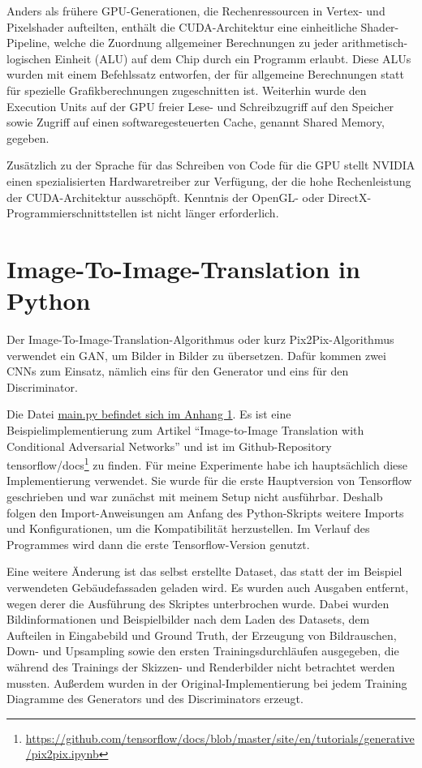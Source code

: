 Anders als frühere GPU-Generationen, die Rechenressourcen in Vertex- und Pixelshader aufteilten, enthält die CUDA-Architektur eine einheitliche Shader-Pipeline, welche die Zuordnung allgemeiner Berechnungen zu jeder arithmetisch-logischen Einheit (ALU) auf dem Chip durch ein Programm erlaubt. Diese ALUs wurden mit einem Befehlssatz entworfen, der für allgemeine Berechnungen statt für spezielle Grafikberechnungen zugeschnitten ist. Weiterhin wurde den Execution Units auf der GPU freier Lese- und Schreibzugriff auf den Speicher sowie Zugriff auf einen softwaregesteuerten Cache, genannt Shared Memory, gegeben.

Zusätzlich zu der Sprache für das Schreiben von Code für die GPU stellt NVIDIA einen spezialisierten Hardwaretreiber zur Verfügung, der die hohe Rechenleistung der CUDA-Architektur ausschöpft. Kenntnis der OpenGL- oder DirectX-Programmierschnittstellen ist nicht länger erforderlich. \cite{sanders2010cuda}

\section{Image-To-Image-Translation in Python}
\label{sec:pix2pix}
Der Image-To-Image-Translation-Algorithmus oder kurz Pix2Pix-Algorithmus verwendet ein GAN, um Bilder in Bilder zu übersetzen. Dafür kommen zwei CNNs zum Einsatz, nämlich eins für den Generator und eins für den Discriminator. \cite{isola2018imagetoimage}

Die Datei \hyperref[pix2pixpy]{main.py befindet sich im Anhang 1}. Es ist eine Beispielimplementierung zum Artikel ``Image-to-Image Translation with Conditional Adversarial Networks'' \cite{isola2018imagetoimage} und ist im Github-Repository tensorflow/docs\footnote{\href{https://github.com/tensorflow/docs/blob/master/site/en/tutorials/generative/pix2pix.ipynb}{https://github.com/tensorflow/docs/blob/master/site/en/tutorials/generative/pix2pix.ipynb}} zu finden. Für meine Experimente habe ich hauptsächlich diese Implementierung verwendet. Sie wurde für die erste Hauptversion von Tensorflow geschrieben und war zunächst mit meinem Setup nicht ausführbar. Deshalb folgen den Import-Anweisungen am Anfang des Python-Skripts weitere Imports und Konfigurationen, um die Kompatibilität herzustellen. Im Verlauf des Programmes wird dann die erste Tensorflow-Version genutzt.

Eine weitere Änderung ist das selbst erstellte Dataset, das statt der im Beispiel verwendeten Gebäudefassaden geladen wird. Es wurden auch Ausgaben entfernt, wegen derer die Ausführung des Skriptes unterbrochen wurde. Dabei wurden Bildinformationen und Beispielbilder nach dem Laden des Datasets, dem Aufteilen in Eingabebild und Ground Truth, der Erzeugung von Bildrauschen, Down- und Upsampling sowie den ersten Trainingsdurchläufen ausgegeben, die während des Trainings der Skizzen- und Renderbilder nicht betrachtet werden mussten. Außerdem wurden in der Original-Implementierung bei jedem Training Diagramme des Generators und des Discriminators erzeugt.

